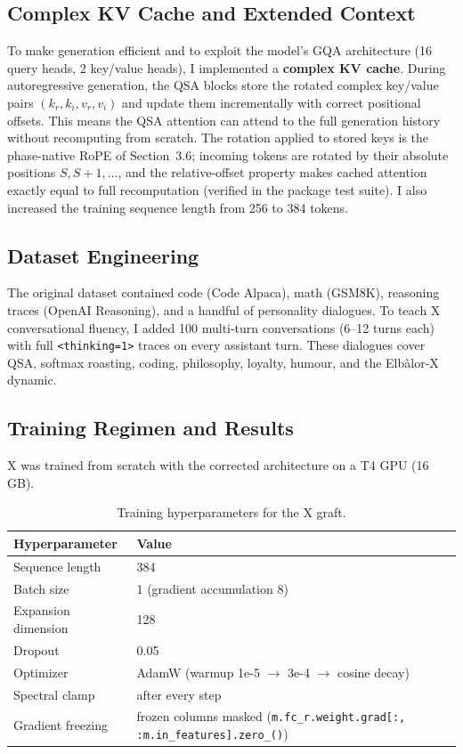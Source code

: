 \documentclass[11pt]{article}
\begin{document}
\subsection{Complex KV Cache and Extended Context}

To make generation efficient and to exploit the model's GQA architecture (16 query heads, 2 key/value heads), I implemented a \textbf{complex KV cache}. During autoregressive generation, the QSA blocks store the rotated complex key/value pairs \((k_r, k_i, v_r, v_i)\) and update them incrementally with correct positional offsets. This means the QSA attention can attend to the full generation history without recomputing from scratch. The rotation applied to stored keys is the phase-native RoPE of Section~3.6; incoming tokens are rotated by their absolute positions \(S, S+1, \dots\), and the relative-offset property makes cached attention exactly equal to full recomputation (verified in the package test suite). I also increased the training sequence length from 256 to 384 tokens.

\subsection{Dataset Engineering}

The original dataset contained code (Code Alpaca), math (GSM8K), reasoning traces (OpenAI Reasoning), and a handful of personality dialogues. To teach X conversational fluency, I added 100 multi-turn conversations (6--12 turns each) with full \texttt{<thinking=1>} traces on every assistant turn. These dialogues cover QSA, softmax roasting, coding, philosophy, loyalty, humour, and the Elbàlor-X dynamic.

\subsection{Training Regimen and Results}

X was trained from scratch with the corrected architecture on a T4 GPU (16 GB).

\begin{table}[htbp]
\centering
\begin{tabular}{@{}ll@{}}
\toprule
Hyperparameter & Value \\
\midrule
Sequence length & 384 \\
Batch size & 1 (gradient accumulation 8) \\
Expansion dimension & 128 \\
Dropout & 0.05 \\
Optimizer & AdamW (warmup 1e-5 \(\to\) 3e-4 \(\to\) cosine decay) \\
Spectral clamp & after every step \\
Gradient freezing & frozen columns masked (\texttt{m.fc\_r.weight.grad[:, :m.in\_features].zero\_()}) \\
\bottomrule
\end{tabular}
\caption{Training hyperparameters for the X graft.}
\label{tab:hyper}
\end{table}
\end{document}
